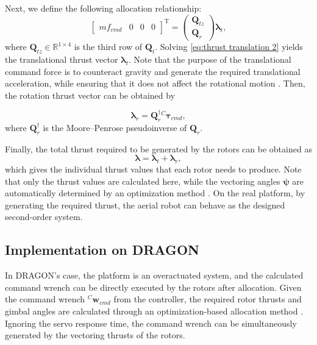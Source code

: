 Next, we define the following allocation relationship:
\begin{equation}
\label{eq:thrust translation 2}
     \begin{bmatrix} mf_{cmd}&0&0&0\end{bmatrix}^{\mathrm{T}}=\begin{pmatrix}
\boldsymbol{Q}_{tz} \\
\boldsymbol{Q}_r
\end{pmatrix}\boldsymbol{\lambda}_t,
\end{equation}
where $\boldsymbol{Q}_{tz} \in \mathbb{R}^{1 \times 4}$ is the third row of $\boldsymbol{Q}_t$. Solving \eqref{eq:thrust translation 2} yields the translational thrust vector $\boldsymbol{\lambda}_t$. Note that the purpose of the translational command force is to counteract gravity and generate the required translational acceleration, while ensuring that it does not affect the rotational motion \cite{zhao_2021_singularity}. Then, the rotation thrust vector can be obtained by


\begin{equation}
\label{eq:thrust rotation 1}
     \boldsymbol{\lambda}_r=\boldsymbol{Q}_r^{\dagger}{^{C}\boldsymbol{\tau}_{cmd}},
\end{equation}
where $\boldsymbol{Q}_r^{\dagger}$ is the Moore--Penrose pseudoinverse of $\boldsymbol{Q}_r$.

Finally, the total thrust required to be generated by the rotors can be obtained as
\begin{equation}
\label{eq:thrust}
\boldsymbol{\lambda}=\boldsymbol{\lambda}_t+\boldsymbol{\lambda}_r,
\end{equation}
which gives the individual thrust values that each rotor needs to produce. Note that only the thrust values are calculated here, while the vectoring angles $\boldsymbol{\psi}$ are automatically determined by an optimization method \cite{zhao_2021_singularity}. On the real platform, by generating the required thrust, the aerial robot can behave as the designed second-order system.
\subsection{Implementation on DRAGON}

In DRAGON's case, the platform is an overactuated system, and the calculated command wrench can be directly executed by the rotors after allocation. Given the command wrench $^C\boldsymbol{w}_{cmd}$ from the controller, the required rotor thrusts and gimbal angles are calculated through an optimization-based allocation method \cite{zhao_2023_versatile}. Ignoring the servo response time, the command wrench can be simultaneously generated by the vectoring thrusts of the rotors.

